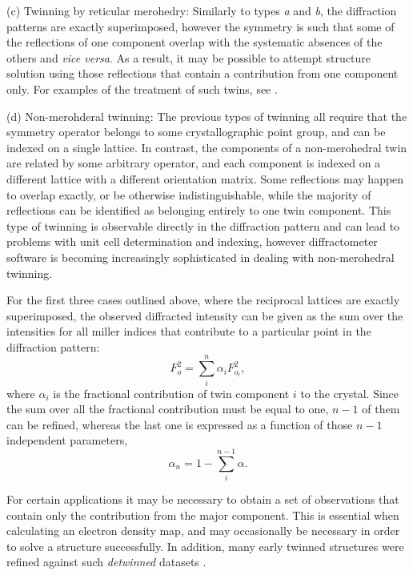 \documentclass[pdf]{iucr}
\begin{document}
(c) Twinning by reticular merohedry: Similarly to types \emph{a} and \emph{b}, the diffraction patterns are exactly superimposed, however the symmetry is such that some of the reflections of one component overlap with the systematic absences of the others and \emph{vice versa}. As a result, it may be possible to attempt structure solution using those reflections that contain a contribution from one component only. For examples of the treatment of such twins, see \cite{Herbst-Irmer:jz0014}.

(d) Non-merohderal twinning: The previous types of twinning all require that the symmetry operator belongs to some crystallographic point group, and can be indexed on a single lattice. In contrast, the components of a non-merohedral twin are related by some arbitrary operator, and each component is indexed on a different lattice with a different orientation matrix. Some reflections may happen to overlap exactly, or be otherwise indistinguishable, while the majority of reflections can be identified as belonging entirely to one twin component. This type of twinning is observable directly in the diffraction pattern and can lead to problems with unit cell determination and indexing, however diffractometer software is becoming increasingly sophisticated in dealing with non-merohedral twinning.

For the first three cases outlined above, where the reciprocal lattices are exactly superimposed, the observed diffracted intensity can be given as the sum over the intensities for all miller indices that contribute to a particular point in the diffraction pattern:
\begin{equation}
F_o^2 = \sum_i^{n}{\alpha_i F_{o_i}^2}
\label{eq:twin_eq},
\end{equation}
where $\alpha_i$ is the fractional contribution of twin component $i$ to the crystal. Since the sum over all the fractional contribution must be equal to one, $n-1$ of them can be refined, whereas the last one is expressed as a function of those $n-1$ independent parameters,
\begin{equation}
\alpha_n = 1 - \sum_i^{n-1}{\alpha}
\label{eq:twin_fractions}.
\end{equation}

For certain applications it may be necessary to obtain a set of observations that contain only the contribution from the major component. This is essential when calculating an electron density map, and may occasionally be necessary in order to solve a structure successfully. In addition, many early twinned structures were refined against such \emph{detwinned} datasets \cite{Grainger:a06498,Murray-Rust:a10328,Britton:a08682}.
\end{document}
